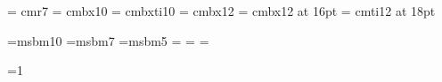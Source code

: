
%



\font\small = cmr7
\font\sxmplbx = cmbx10 
\font\sxmplbxti = cmbxti10 
\font\xmplbx = cmbx12 %
\font\mxmplbx = cmbx12 at 16pt
\font\bxmplbx = cmti12 at 18pt %

\font\tenamsb=msbm10 \font\sevenamsb=msbm7 \font\fiveamsb=msbm5
\newfam\bbfam
\textfont\bbfam=\tenamsb
\scriptfont\bbfam=\sevenamsb
\scriptscriptfont\bbfam=\fiveamsb

\def\bbb{\fam\bbfam}

\def\E#1{%
{\bbb E}\left[#1\right]
}

\def\title#1{%
{\bxmplbx {\centerline {#1}}}
\vskip .2in
  {\leftskip = 2.5in%
  \par\noindent\llap{\hbox to 2.5in{\hfil {\bf Author:} }}{\it R. Scott
  McIntire}\par\noindent {\it Financial Engineering}%
  }%
\vskip .1in
 {\leftskip = 2.5in%
  \par\noindent\llap{\hbox to 2.5in{\hfil {\bf Date:} }} \date \par%
  }%
\vskip .25in
\hrule height 1pt
\vskip .1in
}

\def\section#1{\vskip .5in \centerline{\mxmplbx #1} \bigskip}

\def\subsection#1{\vskip .25 in \leftline{\xmplbx #1} \medskip}

=1
\def\chapter#1{%
\vfil
\supereject
{\bxmplbx {\centerline {Chapter \number\count3: #1}}}
\vskip .2in
\hrule height 1pt
\vskip .2in
\ifnum \count3 = 1 \pageno=1 \fi
\global\advance\count3 by 1
}%

\def\appendix#1{%
\vfil
\supereject
\section{#1}
}%

